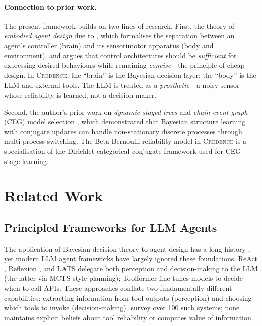 \documentclass[11pt]{article}
\newcommand{\credence}{\textsc{Credence}}
\begin{document}
\paragraph{Connection to prior work.} The present framework builds on two lines of research. First, the theory of \emph{embodied agent design} due to \citet{ay2015geometric}, which formalises the separation between an agent's controller (brain) and its sensorimotor apparatus (body and environment), and argues that control architectures should be \emph{sufficient} for expressing desired behaviours while remaining \emph{concise}---the principle of cheap design. In \credence{}, the ``brain'' is the Bayesian decision layer; the ``body'' is the LLM and external tools. The LLM is treated as a \emph{prosthetic}---a noisy sensor whose reliability is learned, not a decision-maker.

Second, the author's prior work on \emph{dynamic staged trees} \citep{freeman2011dynamic} and \emph{chain event graph} (CEG) model selection \citep{freeman2011bayesian}, which demonstrated that Bayesian structure learning with conjugate updates can handle non-stationary discrete processes through multi-process switching. The Beta-Bernoulli reliability model in \credence{} is a specialisation of the Dirichlet-categorical conjugate framework used for CEG stage learning.


\section{Related Work}
\label{sec:related}

\subsection{Principled Frameworks for LLM Agents}

The application of Bayesian decision theory to agent design has a long history \citep{russell1991principles, boutilier1999decision, kaelbling1998planning}, yet modern LLM agent frameworks have largely ignored these foundations. ReAct \citep{yao2023react}, Reflexion \citep{shinn2023reflexion}, and LATS \citep{zhou2024lats} delegate both perception and decision-making to the LLM (the latter via MCTS-style planning); Toolformer \citep{schick2023toolformer} fine-tunes models to decide when to call APIs. These approaches conflate two fundamentally different capabilities: extracting information from tool outputs (perception) and choosing which tools to invoke (decision-making). \citet{wang2023llmagent} survey over 100 such systems; none maintains explicit beliefs about tool reliability or computes value of information.
\end{document}
